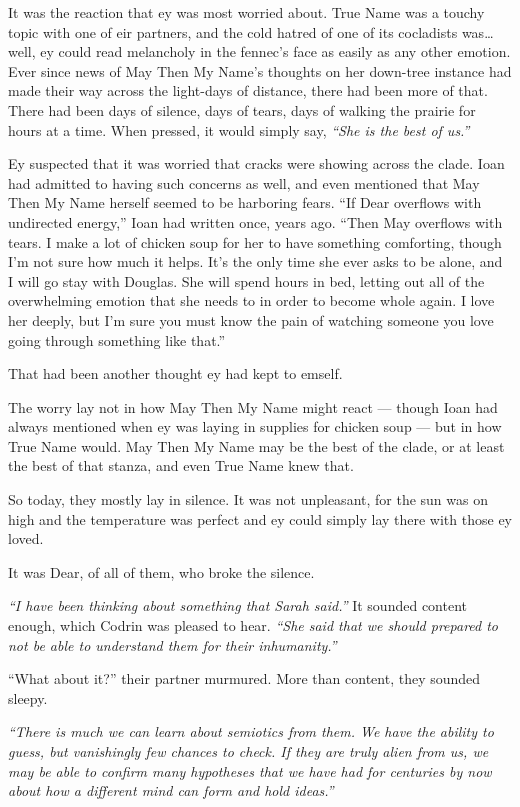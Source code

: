 It was the reaction that ey was most worried about. True Name was a touchy topic with one of eir partners, and the cold hatred of one of its cocladists was\ldots well, ey could read melancholy in the fennec's face as easily as any other emotion. Ever since news of May Then My Name's thoughts on her down-tree instance had made their way across the light-days of distance, there had been more of that. There had been days of silence, days of tears, days of walking the prairie for hours at a time. When pressed, it would simply say, \emph{``She is the best of us.''}

Ey suspected that it was worried that cracks were showing across the clade. Ioan had admitted to having such concerns as well, and even mentioned that May Then My Name herself seemed to be harboring fears. ``If Dear overflows with undirected energy,'' Ioan had written once, years ago. ``Then May overflows with tears. I make a lot of chicken soup for her to have something comforting, though I'm not sure how much it helps. It's the only time she ever asks to be alone, and I will go stay with Douglas. She will spend hours in bed, letting out all of the overwhelming emotion that she needs to in order to become whole again. I love her deeply, but I'm sure you must know the pain of watching someone you love going through something like that.''

That had been another thought ey had kept to emself.

The worry lay not in how May Then My Name might react — though Ioan had always mentioned when ey was laying in supplies for chicken soup — but in how True Name would. May Then My Name may be the best of the clade, or at least the best of that stanza, and even True Name knew that.

So today, they mostly lay in silence. It was not unpleasant, for the sun was on high and the temperature was perfect and ey could simply lay there with those ey loved.

It was Dear, of all of them, who broke the silence.

\emph{``I have been thinking about something that Sarah said.''} It sounded content enough, which Codrin was pleased to hear. \emph{``She said that we should prepared to not be able to understand them for their inhumanity.''}

``What about it?'' their partner murmured. More than content, they sounded sleepy.

\emph{``There is much we can learn about semiotics from them. We have the ability to guess, but vanishingly few chances to check. If they are truly alien from us, we may be able to confirm many hypotheses that we have had for centuries by now about how a different mind can form and hold ideas.''}

